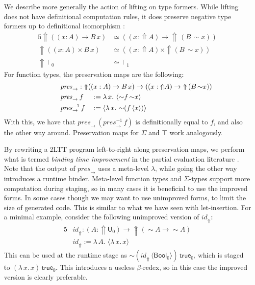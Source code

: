 \documentclass[acmsmall,screen]{acmart}
\newcommand{\mit}[1]{\mathit{#1}}
\newcommand{\msf}[1]{\mathsf{#1}}
\newcommand{\Lift}{{\Uparrow}}
\newcommand{\spl}{{\sim}}
\newcommand{\qut}[1]{\langle #1\rangle}
\newcommand{\U}{\msf{U}}
\newcommand{\Bool}{\msf{Bool}}
\newcommand{\true}{\msf{true}}
\theoremstyle{remark}
\begin{document}
We describe more generally the action of lifting on type formers. While lifting
does not have definitional computation rules, it does preserve negative type formers up
to definitional isomorphism \cite[Section~2.3]{twolevel}:
\begin{alignat*}{5}
  \Lift((x : A) \to B\,x) &\simeq ((x : \Lift A) \to \Lift\,(B\,\spl x))\\
  \Lift ((x : A) \times B\,x) &\simeq ((x : \Lift A) \times \Lift (B\,\spl x))\\
  \Lift \top_0 &\simeq \top_1
\end{alignat*}
For function types, the preservation maps are the following:
\begin{alignat*}{5}
  & \hspace{-6em}\rlap{$\mit{pres}_\to : \Lift((x : A) \to B\,x) \to ((x : \Lift A) \to \Lift\,(B\,\spl x))$}\\
  & \hspace{-6em}\mit{pres}_\to\,f     &&:= \lambda\,x.\,\,\qut{\spl f\,\spl x}\\
  & \hspace{-6em}\mit{pres}_\to^{-1}\,f &&:= \qut{\lambda\,x.\,\,\spl(f\,\qut{x})}
\end{alignat*}
With this, we have that $\mit{pres}_\to\,(\mit{pres}_\to^{-1}\,f)$ is
definitionally equal to $f$, and also the other way around. Preservation maps
for $\Sigma$ and $\top$ work analogously.

By rewriting a 2LTT program left-to-right along preservation maps, we perform
what is termed \emph{binding time improvement} in the partial evaluation
literature \cite[Chapter~12]{partial-evaluation}. Note that the output of $\mit{pres}_{\to}$ uses a
meta-level $\lambda$, while going the other way introduces a runtime
binder. Meta-level function types and $\Sigma$-types support more computation during
staging, so in many cases it is beneficial to use the improved forms. In some
cases though we may want to use unimproved forms, to limit the size of generated
code. This is similar to what we have seen with let-insertion. For a minimal
example, consider the following unimproved version of $\mit{id}_\Lift$:
\begin{alignat*}{5}
  & \mit{id}_\Lift : (A : \Lift \U_0) \to \Lift(\spl A \to \spl A) \\
  & \mit{id}_\Lift := \lambda\,A.\,\,\qut{\lambda\,x.\,x}
\end{alignat*}
This can be used at the runtime stage as
$\spl(\mit{id}_\Lift\,\qut{\Bool_0})\,\true_0$, which is staged to
$(\lambda\,x.\,x)\,\true_0$.  This introduces a useless $\beta$-redex, so in
this case the improved version is clearly preferable.
\end{document}
